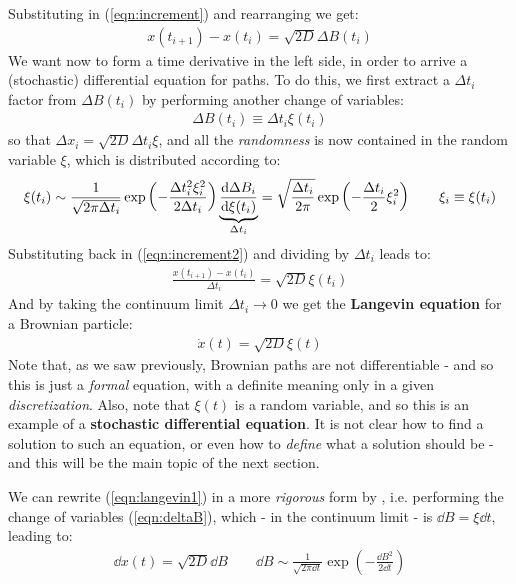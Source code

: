 \documentclass[../template.tex]{subfiles}
\begin{document}
Substituting in (\ref{eqn:increment}) and rearranging we get:
\begin{align}
    x(t_{i+1}) - x(t_i) = \sqrt{2 D} \Delta B(t_i)  \label{eqn:increment2}
\end{align}
We want now to form a time derivative in the left side, in order to arrive a (stochastic) differential equation for paths. To do this, we first extract a $\Delta t_i$ factor from $\Delta B(t_i)$ by performing another change of variables:
\begin{align}
    \Delta B(t_i) \equiv \Delta t_i \xi(t_i) 
    \label{eqn:deltaB}
\end{align}  
so that $\Delta x_i = \sqrt{2D} \Delta t_i \xi$, and all the \textit{randomness} is now contained in the random variable $\xi$, which is distributed according to:
\begin{align*}
    \xi(t_i) \sim \frac{1}{\sqrt{2 \pi \Delta t_i}} \exp\left(-\frac{\Delta t_i^2 \xi_i^2}{2 \Delta t_i} \right) \underbrace{\dv{\Delta B_i}{\xi (t_i)}}_{\Delta t_i} = \sqrt{\frac{\Delta t_i}{2 \pi} } \exp\left(-\frac{\Delta t_i }{2} \xi_i^2 \right) \qquad \xi_i \equiv \xi(t_i)  
\end{align*}   
Substituting back in (\ref{eqn:increment2}) and dividing by $\Delta t_i$ leads to:
\begin{align*}
    \frac{x(t_{i+1})-x(t_i)}{\Delta t_i}  = \sqrt{2D} \xi(t_i)
\end{align*}
And by taking the continuum limit $\Delta t_i \to 0$ we get the \textbf{Langevin equation} for a Brownian particle:
\begin{align}
    \dot{x}(t) = \sqrt{2D} \xi(t)
    \label{eqn:langevin1}
\end{align}
Note that, as we saw previously, Brownian paths are not differentiable - and so this is just a \textit{formal} equation, with a definite meaning only in a given \textit{discretization}. Also, note that $\xi(t)$ is a random variable, and so this is an example of a \textbf{stochastic differential equation}. It is not clear how to find a solution to such an equation, or even how to \textit{define} what a solution should be - and this will be the main topic of the next section.

We can rewrite (\ref{eqn:langevin1}) in a more \textit{rigorous} form by , i.e. performing the change of variables (\ref{eqn:deltaB}), which - in the continuum limit - is $\dd{B} = \xi \dd{t}$, leading to:
\begin{align*}
    \dd{x(t)} = \sqrt{2 D} \dd{B} \qquad \dd{B} \sim \frac{1}{\sqrt{2 \pi \dd{t}}} \exp\left(-\frac{\dd{B}^2}{2 \dd{t}} \right) 
\end{align*}  
\end{document}
